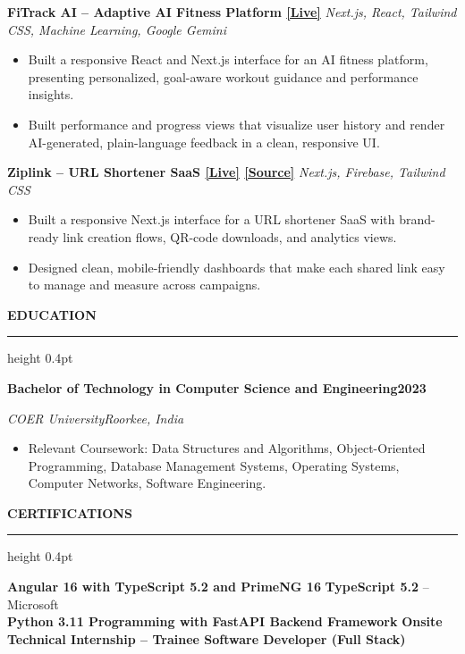 \documentclass[10pt,a4paper]{article}
\newcommand{\resumeSection}[1]{%
  \vspace{5pt}
  {\normalsize\bfseries\color{heading} #1}\par
  \vspace{1pt}
  {\color{rulecolor}\hrule height 0.4pt}
  \vspace{3pt}
}
\newcommand{\resumeSubheading}[4]{%
  \textbf{#1}\hfill\textbf{#2}\par
  \textit{#3}\hfill\textit{#4}\par
  \vspace{-0.15em}
}
\newcommand{\projectHeading}[2]{%
  \textbf{#1} \textbar{} \textit{#2}\par
  \vspace{-0.15em}
}
\begin{document}
\projectHeading
{FiTrack AI -- Adaptive AI Fitness Platform \href{https://fittrack.0xshiv.dev/}{[Live]}}
{Next.js, React, Tailwind CSS, Machine Learning, Google Gemini}

\begin{itemize}
  \item Built a responsive React and Next.js interface for an AI fitness
  platform, presenting personalized, goal-aware workout guidance and
  performance insights.

  \item Built performance and progress views that visualize user history and
  render AI-generated, plain-language feedback in a clean, responsive UI.
\end{itemize}

\projectHeading
{Ziplink -- URL Shortener SaaS \href{https://ziplink.0xshiv.dev}{[Live]} \href{https://github.com/Tech-aficionado/ZipLink---Open-Source}{[Source]}}
{Next.js, Firebase, Tailwind CSS}

\begin{itemize}
  \item Built a responsive Next.js interface for a URL shortener SaaS with
  brand-ready link creation flows, QR-code downloads, and analytics views.

  \item Designed clean, mobile-friendly dashboards that make each shared link
  easy to manage and measure across campaigns.
\end{itemize}

\resumeSection{EDUCATION}

\resumeSubheading
{Bachelor of Technology in Computer Science and Engineering}
{2023}
{COER University}
{Roorkee, India}

\begin{itemize}
  \item Relevant Coursework: Data Structures and Algorithms,
  Object-Oriented Programming, Database Management Systems, Operating
  Systems, Computer Networks, Software Engineering.
\end{itemize}

\resumeSection{CERTIFICATIONS}

{\small
\textbf{Angular 16 with TypeScript 5.2 and PrimeNG 16}
\quad \textbar{} \quad
\textbf{TypeScript 5.2} -- Microsoft
\\[2pt]
\textbf{Python 3.11 Programming with FastAPI Backend Framework}
\quad \textbar{} \quad
\textbf{Onsite Technical Internship -- Trainee Software Developer (Full Stack)}
}
\end{document}
